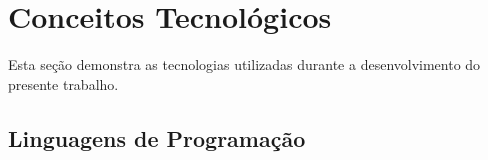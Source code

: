 \section{Conceitos Tecnológicos}

Esta seção demonstra as tecnologias utilizadas durante a desenvolvimento do presente trabalho.

\subsection{Linguagens de Programação}





